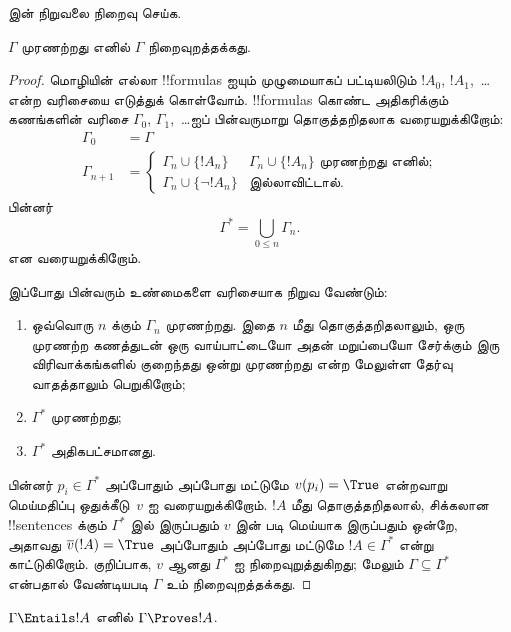 \documentclass[../../../include/open-logic-section]{subfiles}
\begin{document}
\begin{prob}
   இன் நிறுவலை நிறைவு செய்க.
\end{prob}

\begin{thm}[நிறைவுத்தன்மை]
$\Gamma$ முரணற்றது எனில் $\Gamma$ நிறைவுறத்தக்கது.
\end{thm}

\begin{proof}
மொழியின் எல்லா !!{formula}s ஐயும் முழுமையாகப்
பட்டியலிடும் $!A_0$, $!A_1$,~\dots என்ற வரிசையை
எடுத்துக் கொள்வோம். !!{formula}s கொண்ட
அதிகரிக்கும் கணங்களின் வரிசை $\Gamma_0$,
$\Gamma_1$,~\dots ஐப் பின்வருமாறு தொகுத்தறிதலாக
வரையறுக்கிறோம்:
\begin{align*}
\Gamma_0 & = \Gamma\\
\Gamma_{n+1} &  =
\begin{cases}
  \Gamma_n \cup \{!A_n\} & \text{$\Gamma_n \cup \{!A_n\}$ முரணற்றது எனில்;}\\
  \Gamma_n \cup \{\lnot !A_n\} & \text{இல்லாவிட்டால்}.
\end{cases}
\end{align*}
பின்னர்
\[
\Gamma^* = \bigcup_{0\le n}\Gamma_n.
\]
என வரையறுக்கிறோம்.

இப்போது பின்வரும் உண்மைகளை வரிசையாக நிறுவ வேண்டும்:
\begin{enumerate}
\item ஒவ்வொரு $n$ க்கும் $\Gamma_n$ முரணற்றது.
  இதை $n$ மீது தொகுத்தறிதலாலும், ஒரு முரணற்ற
  கணத்துடன் ஒரு வாய்பாட்டையோ அதன் மறுப்பையோ
  சேர்க்கும் இரு விரிவாக்கங்களில் குறைந்தது ஒன்று
  முரணற்றது என்ற மேலுள்ள தேர்வு வாதத்தாலும் பெறுகிறோம்;
\item $\Gamma^*$ முரணற்றது;
\item $\Gamma^*$ அதிகபட்சமானது.
\end{enumerate}
பின்னர் $p_i \in \Gamma^*$ அப்போதும் அப்போது
மட்டுமே $v(p_i) = \True$ என்றவாறு மெய்மதிப்பு
ஒதுக்கீடு~$v$ ஐ வரையறுக்கிறோம். $!A$ மீது
தொகுத்தறிதலால், சிக்கலான !!{sentence}s க்கும்
$\Gamma^*$ இல் இருப்பதும் $v$ இன் படி மெய்யாக
இருப்பதும் ஒன்றே, அதாவது
$\overline{v}(!A) = \True$ அப்போதும் அப்போது
மட்டுமே $!A \in \Gamma^*$ என்று காட்டுகிறோம்.
குறிப்பாக, $v$ ஆனது $\Gamma^*$ ஐ நிறைவுறுத்துகிறது;
மேலும் $\Gamma \subseteq \Gamma^*$ என்பதால்
வேண்டியபடி $\Gamma$ உம் நிறைவுறத்தக்கது.
\end{proof}

\begin{cor}
$\Gamma \Entails !A$ எனில் $\Gamma \Proves !A$.
\end{cor}
\end{document}
